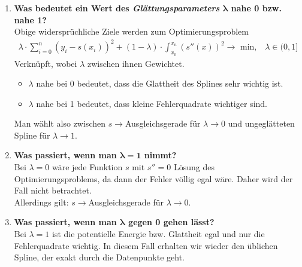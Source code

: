 \begin{enumerate}
		\item \textbf{Was bedeutet ein Wert des \textit{Glättungsparameters} \(\mathbf{\lambda}\) nahe 0 bzw. nahe 1?} \\
			Obige widersprüchliche Ziele werden zum Optimierungsproblem
			\begin{align*}
				\lambda\cdot\sum_{i=0}^{n}\left(y_i-s(x_i)\right)^2+\left(1-\lambda\right)\cdot\int_{x_0}^{x_n}\left(s''(x)\right)^2 \rightarrow \text{ min,} \quad \lambda\in(0,1]
			\end{align*}
			Verknüpft, wobei \(\lambda\) zwischen ihnen Gewichtet.
			\begin{itemize}
				\item \(\lambda\) nahe bei 0 bedeutet, dass die Glattheit des Splines sehr wichtig ist.
				\item \(\lambda\) nahe bei 1 bedeutet, dass kleine Fehlerquadrate wichtiger sind.
			\end{itemize}
			Man wählt also zwischen \(s\rightarrow\)Ausgleichsgerade für \(\lambda\rightarrow 0\) und ungeglätteten Spline für \(\lambda \rightarrow 1\).
		
		\item \textbf{Was passiert, wenn man \(\mathbf{\lambda=1}\) nimmt?} \\
			Bei \(\lambda=0\) wäre jede Funktion \(s\) mit \(s''=0\) Lösung des Optimierungsproblems, da dann der Fehler völlig egal wäre. Daher wird der Fall nicht betrachtet.\\
			Allerdings gilt: \(s\rightarrow\)Ausgleichsgerade für \(\lambda\rightarrow 0\).
		
		\item \textbf{Was passiert, wenn man \(\mathbf{\lambda}\) gegen 0 gehen lässt?} \\
			Bei \(\lambda=1\) ist die potentielle Energie bzw. Glattheit egal und nur die Fehlerquadrate wichtig. In diesem Fall erhalten wir wieder den üblichen Spline, der exakt durch die Datenpunkte geht.
	\end{enumerate}